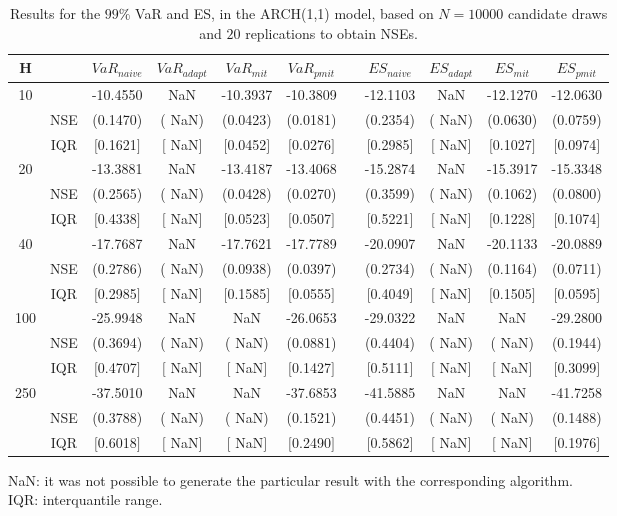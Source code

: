 \begin{table}[h] 
\centering 
\caption{Results for the $99\%$ VaR and ES, in the ARCH(1,1) model, based on $N=10000$ candidate draws and $20$ replications to obtain NSEs.} 
\label{tab:res_algos_arch} 
\begin{tabular}{ccccccccccc}  
 H & & $VaR_{naive}$ & $VaR_{adapt}$ & $VaR_{mit}$  & $VaR_{pmit}$ &  & $ES_{naive}$ & $ES_{adapt}$ & $ES_{mit}$ & $ES_{pmit}$ \\ \hline 
10 & & -10.4550 &    NaN & -10.3937 & -10.3809 & & -12.1103 &    NaN & -12.1270 & -12.0630  \\ 
  & NSE & (0.1470) & (   NaN) & (0.0423) & (0.0181) & & (0.2354) & (   NaN) & (0.0630) & (0.0759)   \\ 
 & IQR & $[$0.1621$]$ & $[$   NaN$]$ & $[$0.0452$]$ & $[$0.0276$]$ & & $[$0.2985$]$ & $[$   NaN$]$ & $[$0.1027$]$ & $[$0.0974$]$  \\ [1ex] 
20 & & -13.3881 &    NaN & -13.4187 & -13.4068 & & -15.2874 &    NaN & -15.3917 & -15.3348  \\ 
  & NSE & (0.2565) & (   NaN) & (0.0428) & (0.0270) & & (0.3599) & (   NaN) & (0.1062) & (0.0800)   \\ 
 & IQR & $[$0.4338$]$ & $[$   NaN$]$ & $[$0.0523$]$ & $[$0.0507$]$ & & $[$0.5221$]$ & $[$   NaN$]$ & $[$0.1228$]$ & $[$0.1074$]$  \\ [1ex] 
40 & & -17.7687 &    NaN & -17.7621 & -17.7789 & & -20.0907 &    NaN & -20.1133 & -20.0889  \\ 
  & NSE & (0.2786) & (   NaN) & (0.0938) & (0.0397) & & (0.2734) & (   NaN) & (0.1164) & (0.0711)   \\ 
 & IQR & $[$0.2985$]$ & $[$   NaN$]$ & $[$0.1585$]$ & $[$0.0555$]$ & & $[$0.4049$]$ & $[$   NaN$]$ & $[$0.1505$]$ & $[$0.0595$]$  \\ [1ex] 
100 & & -25.9948 &    NaN &    NaN & -26.0653 & & -29.0322 &    NaN &    NaN & -29.2800  \\ 
  & NSE & (0.3694) & (   NaN) & (   NaN) & (0.0881) & & (0.4404) & (   NaN) & (   NaN) & (0.1944)   \\ 
 & IQR & $[$0.4707$]$ & $[$   NaN$]$ & $[$   NaN$]$ & $[$0.1427$]$ & & $[$0.5111$]$ & $[$   NaN$]$ & $[$   NaN$]$ & $[$0.3099$]$  \\ [1ex] 
250 & & -37.5010 &    NaN &    NaN & -37.6853 & & -41.5885 &    NaN &    NaN & -41.7258  \\ 
  & NSE & (0.3788) & (   NaN) & (   NaN) & (0.1521) & & (0.4451) & (   NaN) & (   NaN) & (0.1488)   \\ 
 & IQR & $[$0.6018$]$ & $[$   NaN$]$ & $[$   NaN$]$ & $[$0.2490$]$ & & $[$0.5862$]$ & $[$   NaN$]$ & $[$   NaN$]$ & $[$0.1976$]$  \\ [1ex] 
\hline 
\end{tabular} 
\raggedright 

\vspace{5pt}\footnotesize{NaN: it was not possible to generate the particular result with the corresponding algorithm.} \\ 
\vspace{5pt}\footnotesize{IQR: interquantile range.} 
\end{table} 
